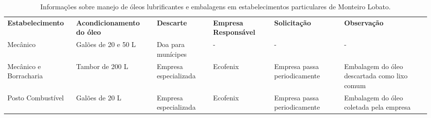 \begin{table}[htbp]
  \centering
  \caption{Informações sobre manejo de óleos lubrificantes e embalagens em estabelecimentos particulares de Monteiro Lobato. }
    \begin{tabular}{P{7.525em}|P{9em}|P{6.145em}|P{6.145em}|P{5.185em}|P{5.885em}}
     \textcolor[rgb]{ 1,  1,  1}{\textbf{Estabelecimento}} & \textcolor[rgb]{ 1,  1,  1}{\textbf{Acondicionamento do óleo }} & \textcolor[rgb]{ 1,  1,  1}{\textbf{Descarte}} & \textcolor[rgb]{ 1,  1,  1}{\textbf{Empresa Responsável}} & \textcolor[rgb]{ 1,  1,  1}{\textbf{Solicitação}} & \textcolor[rgb]{ 1,  1,  1}{\textbf{Observação}} \\
     Mecânico & Galões de 20 e 50 L & Doa para munícipes & -     & -     & - \\
     Mecânico e Borracharia & Tambor de 200 L & Empresa especializada & Ecofenix & Empresa passa periodicamente & Embalagem do óleo descartada como lixo comum \\
     Posto Combustível & Galões de 20 L & Empresa especializada & Ecofenix & Empresa passa periodicamente & Embalagem do óleo coletada pela empresa \\
    \end{tabular}%
  \label{tab:manejo_oleo}%
\end{table}%

